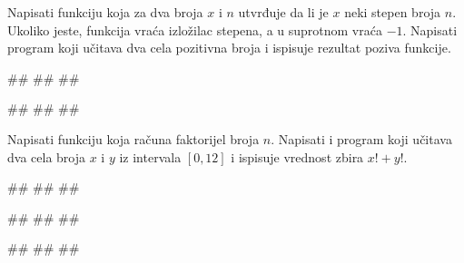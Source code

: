 \begin{Exercise}[label=v1.4_11] 
Napisati funkciju  koja
za dva broja $x$ i $n$ utvrđuje da li je $x$ neki stepen broja
$n$. Ukoliko jeste, funkcija vraća izložilac stepena, a u suprotnom
vraća $-1$. Napisati program koji učitava dva cela pozitivna broja i
ispisuje rezultat poziva funkcije. 

\begin{miditest}
\begin{upotreba}{1}
#\naslovInt#
##
##
\end{upotreba}
\end{miditest}
\begin{miditest}
\begin{upotreba}{2}
#\naslovInt#
##
##
\end{upotreba}
\end{miditest}

\end{Exercise}
\ifresenja 
\begin{Answer}[ref=v1.4_11]
\end{Answer} 
\fi


\begin{Exercise}[label=p1.4_13] 
Napisati funkciju  koja računa faktorijel
broja $n$. Napisati i program koji učitava dva cela broja $x$ i $y$ iz
intervala $[0,12]$ i ispisuje vrednost zbira $x!+y!$.
 
\begin{miditest}
\begin{upotreba}{1}
#\naslovInt#
##
##
\end{upotreba}
\end{miditest}
\begin{miditest}
\begin{upotreba}{2}
#\naslovInt#
##
##
\end{upotreba}
\end{miditest}

\begin{miditest}
\begin{upotreba}{3}
#\naslovInt#
##
##
\end{upotreba}
\end{miditest}

\end{Exercise}
\ifresenja 
\begin{Answer}[ref=p1.4_13]
\end{Answer} 
\fi



